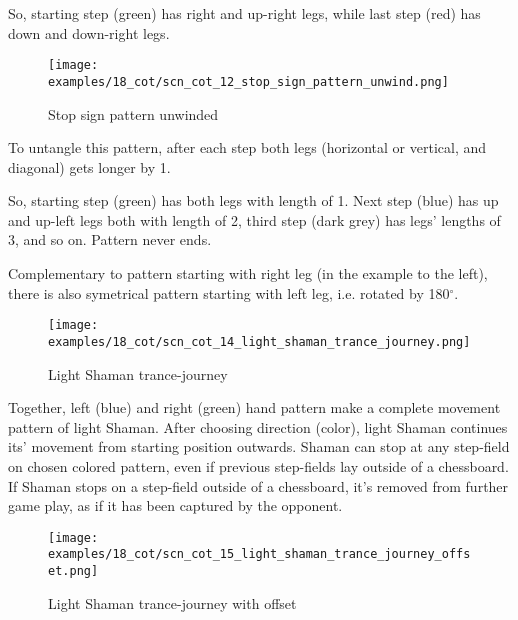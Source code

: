 So, starting step (green) has right and up-right legs, while last step (red)
has down and down-right legs.

\clearpage %

\noindent
\begin{wrapfigure}{l}{0.4\textwidth} %
\centering
\texttt{[image: examples/18\_cot/scn\_cot\_12\_stop\_sign\_pattern\_unwind.png]}
\caption{Stop sign pattern unwinded}
\label{fig:scn_cot_12_stop_sign_pattern_unwind}
\end{wrapfigure}
To untangle this pattern, after each step both legs (horizontal or vertical,
and diagonal) gets longer by 1.

So, starting step (green) has both legs with length of 1. Next step (blue)
has up and up-left legs both with length of 2, third step (dark grey) has
legs' lengths of 3, and so on. Pattern never ends.

Complementary to pattern starting with right leg (in the example to the
left), there is also symetrical pattern starting with left leg, i.e.
rotated by 180$^{\circ}$. %

\clearpage %

\noindent
\begin{figure}[!h]
\texttt{[image: examples/18\_cot/scn\_cot\_14\_light\_shaman\_trance\_journey.png]}
\caption{Light Shaman trance-journey}
\label{fig:scn_cot_14_light_shaman_trance_journey}
\end{figure}

Together, left (blue) and right (green) hand pattern make a complete movement
pattern of light Shaman. After choosing direction (color), light Shaman
continues its' movement from starting position outwards. Shaman can stop at
any step-field on chosen colored pattern, even if previous step-fields lay
outside of a chessboard. If Shaman stops on a step-field outside of a
chessboard, it's removed from further game play, as if it has been captured
by the opponent.

\clearpage %

\noindent
\begin{figure}[!h]
\texttt{[image: examples/18\_cot/scn\_cot\_15\_light\_shaman\_trance\_journey\_offset.png]}
\caption{Light Shaman trance-journey with offset}
\label{fig:scn_cot_15_light_shaman_trance_journey_offset}
\end{figure}

